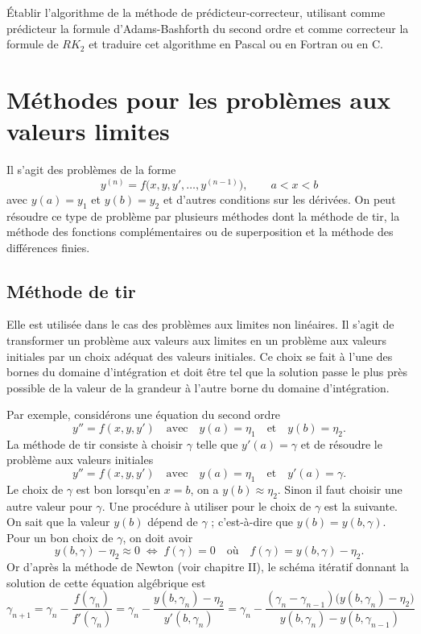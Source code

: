\begin{exercice}
Établir l'algorithme de la méthode de prédicteur-correcteur, utilisant comme
prédicteur la formule d'Adams-Bashforth du second ordre et comme correcteur la
formule de $RK_2$ et traduire cet algorithme en Pascal ou en Fortran ou en C.
\end{exercice}

\section{Méthodes pour les problèmes aux valeurs limites}

Il s'agit des problèmes de la forme
\[
  y^{(n)} = f\bigl(x, y, y', \dots, y^{(n-1)}\bigr), \qquad a < x < b
\]
avec $y(a) = y_1$ et $y(b) = y_2$ et d'autres conditions sur les dérivées. On
peut résoudre ce type de problème par plusieurs méthodes dont la méthode de
tir, la méthode des fonctions complémentaires ou de superposition et la
méthode des différences finies.

\subsection{Méthode de tir}

Elle est utilisée dans le cas des problèmes aux limites non linéaires. Il
s'agit de transformer un problème aux valeurs aux limites en un problème aux
valeurs initiales par un choix adéquat des valeurs initiales. Ce choix se fait
à l'une des bornes du domaine d'intégration et doit être tel que la solution
passe le plus près possible de la valeur de la grandeur à l'autre borne du
domaine d'intégration.

Par exemple, considérons une équation du second ordre
\[
  y'' = f(x, y, y') \quad\text{avec}\quad y(a) = \eta_1 \quad\text{et}\quad y(b) = \eta_2 .
\]
La méthode de tir consiste à choisir $\gamma$ telle que $y'(a) = \gamma$ et de
résoudre le problème aux valeurs initiales
\[
  y'' = f(x, y, y') \quad\text{avec}\quad y(a) = \eta_1 \quad\text{et}\quad y'(a) = \gamma .
\]
Le choix de $\gamma$ est bon lorsqu'en $x = b$, on a $y(b) \approx \eta_2$.
Sinon il faut choisir une autre valeur pour $\gamma$. Une procédure à utiliser
pour le choix de $\gamma$ est la suivante. On sait que la valeur $y(b)$ dépend
de $\gamma$ ; c'est-à-dire que $y(b) = y(b, \gamma)$. Pour un bon choix de
$\gamma$, on doit avoir
\[
  y(b, \gamma) - \eta_2 \approx 0 \;\Longleftrightarrow\; f(\gamma) = 0
  \quad\text{où}\quad f(\gamma) = y(b, \gamma) - \eta_2 .
\]
Or d'après la méthode de Newton (voir chapitre II), le schéma itératif donnant
la solution de cette équation algébrique est
\[
  \gamma_{n+1} = \gamma_n - \frac{f(\gamma_n)}{f'(\gamma_n)}
  = \gamma_n - \frac{y(b, \gamma_n) - \eta_2}{y'(b, \gamma_n)}
  = \gamma_n - \frac{(\gamma_n - \gamma_{n-1})\bigl(y(b, \gamma_n) - \eta_2\bigr)}
                    {y(b, \gamma_n) - y(b, \gamma_{n-1})}
\]

